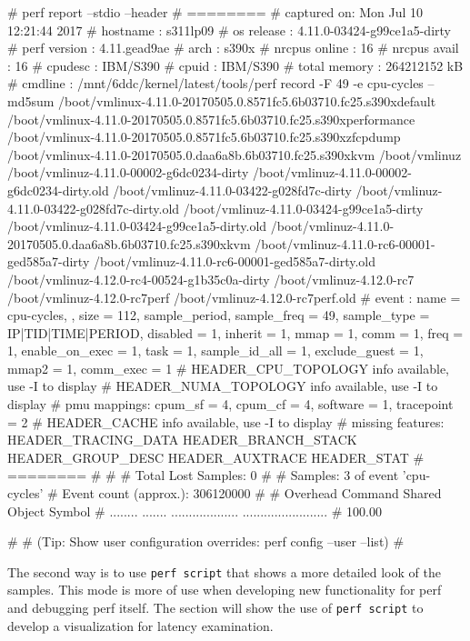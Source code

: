 \starttyping[]
# perf report --stdio --header
# ========
# captured on: Mon Jul 10 12:21:44 2017
# hostname : s311lp09
# os release : 4.11.0-03424-g99ce1a5-dirty
# perf version : 4.11.gead9ae
# arch : s390x
# nrcpus online : 16
# nrcpus avail : 16
# cpudesc : IBM/S390
# cpuid : IBM/S390
# total memory : 264212152 kB
# cmdline : /mnt/6ddc/kernel/latest/tools/perf record -F 49 -e cpu-cycles -- md5sum
/boot/vmlinux-4.11.0-20170505.0.8571fc5.6b03710.fc25.s390xdefault
/boot/vmlinux-4.11.0-20170505.0.8571fc5.6b03710.fc25.s390xperformance
/boot/vmlinux-4.11.0-20170505.0.8571fc5.6b03710.fc25.s390xzfcpdump
/boot/vmlinux-4.11.0-20170505.0.daa6a8b.6b03710.fc25.s390xkvm
/boot/vmlinuz
/boot/vmlinuz-4.11.0-00002-g6dc0234-dirty /boot/vmlinuz-4.11.0-00002-g6dc0234-dirty.old
/boot/vmlinuz-4.11.0-03422-g028fd7c-dirty /boot/vmlinuz-4.11.0-03422-g028fd7c-dirty.old
/boot/vmlinuz-4.11.0-03424-g99ce1a5-dirty /boot/vmlinuz-4.11.0-03424-g99ce1a5-dirty.old
/boot/vmlinuz-4.11.0-20170505.0.daa6a8b.6b03710.fc25.s390xkvm /boot/vmlinuz-4.11.0-rc6-00001-ged585a7-dirty
/boot/vmlinuz-4.11.0-rc6-00001-ged585a7-dirty.old /boot/vmlinuz-4.12.0-rc4-00524-g1b35c0a-dirty
/boot/vmlinuz-4.12.0-rc7 /boot/vmlinuz-4.12.0-rc7perf /boot/vmlinuz-4.12.0-rc7perf.old
# event : name = cpu-cycles, , size = 112, { sample_period, sample_freq } = 49,
  sample_type = IP|TID|TIME|PERIOD, disabled = 1, inherit = 1, mmap = 1, comm = 1,
  freq = 1, enable_on_exec = 1, task = 1, sample_id_all = 1, exclude_guest = 1, mmap2 = 1,
  comm_exec = 1
# HEADER_CPU_TOPOLOGY info available, use -I to display
# HEADER_NUMA_TOPOLOGY info available, use -I to display
# pmu mappings: cpum_sf = 4, cpum_cf = 4, software = 1, tracepoint = 2
# HEADER_CACHE info available, use -I to display
# missing features: HEADER_TRACING_DATA HEADER_BRANCH_STACK HEADER_GROUP_DESC HEADER_AUXTRACE HEADER_STAT
# ========
#
#
# Total Lost Samples: 0
#
# Samples: 3  of event 'cpu-cycles'
# Event count (approx.): 306120000
#
# Overhead  Command  Shared Object        Symbol
# ........  .......  ...................  ........................
#
   100.00%


#
# (Tip: Show user configuration overrides: perf config --user --list)
#
\stoptyping

The second way is to use {\tt perf script} that shows a more detailed look of
the samples. This mode is more of use when developing new functionality for
perf and debugging perf itself. The section 
will show the use of {\tt perf script} to develop a visualization for latency examination.

